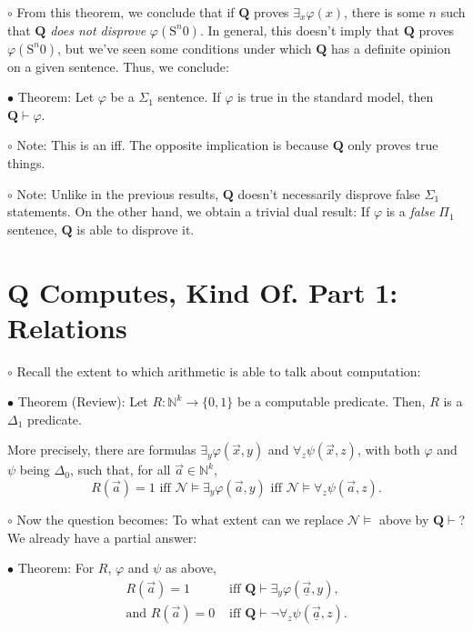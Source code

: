 \documentclass{article}
\newcommand{\N}{\mathbb{N}}
\newcommand{\RQ}{\mathbf{Q}}
\newcommand{\TN}{\mathcal{N}}
\newcommand{\suc}{\mathrm{S}}
\newcommand\Point[1]{\noindent \hspace{\labelsep} {\large $\bullet$ #1} \smallskip}
\newcommand\point[1]{\noindent \hspace{\labelsep} {\small $\circ$ #1} \smallskip}
\newcommand\timestamp[1]{}
\begin{document}
\point{From this theorem, we conclude that if $\RQ$ proves $\exists_x \varphi(x)$, there is some $n$ such that $\RQ$ \emph{does not disprove} $\varphi(\suc^n 0)$. In general, this doesn't imply that $\RQ$ proves $\varphi(\suc^n 0)$, but we've seen some conditions under which $\RQ$ has a definite opinion on a given sentence. Thus, we conclude:}

\Point{Theorem: Let $\varphi$ be a $\Sigma_1$ sentence. If $\varphi$ is true in the standard model, then $\RQ \vdash \varphi$.}

\point{Note: This is an iff. The opposite implication is because $\RQ$ only proves true things.}

\point{Note: Unlike in the previous results, $\RQ$ doesn't necessarily disprove false $\Sigma_1$ statements. On the other hand, we obtain a trivial dual result: If $\varphi$ is a \emph{false} $\Pi_1$ sentence, $\RQ$ is able to disprove it.}

\timestamp{63 min}

\section{$\RQ$ Computes, Kind Of. Part 1: Relations}

\point{Recall the extent to which arithmetic is able to talk about computation:}

\Point{Theorem (Review): Let $R \colon \N^k \to \{0,1\}$ be a computable predicate. Then, $R$ is a $\Delta_1$ predicate.

More precisely, there are formulas $\exists_y \varphi(\vec x, y)$ and $\forall_z \psi(\vec x, z)$, with both $\varphi$ and $\psi$ being $\Delta_0$, such that, for all $\vec a \in \N^k$,
\begin{equation}
R(\vec a) = 1 \text{ iff } \TN \vDash \exists_y \varphi(\vec a, y) \text{ iff } \TN \vDash \forall_z \psi(\vec a, z).
\end{equation}}

\point{Now the question becomes: To what extent can we replace $\TN \vDash$ above by $\RQ \vdash$? We already have a partial answer:}

\Point{Theorem: For $R$, $\varphi$ and $\psi$ as above,
\begin{equation}
\begin{aligned}
R(\vec a) = 1 &\text{ iff } \RQ \vdash \exists_y \varphi(\underline{\vec a}, y),\\
\text{and } R(\vec a) = 0 &\text{ iff } \RQ \vdash \neg\forall_z \psi(\underline{\vec a}, z).
\end{aligned}
\end{equation}}
\end{document}
